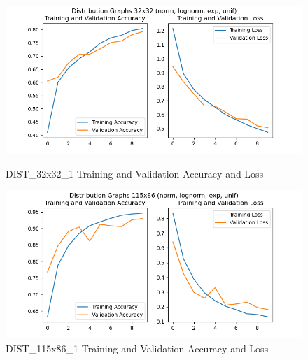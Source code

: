 \documentclass[12pt]{article}
\begin{document}
            \begin{figure}
            
                \begin{center}

                    \includegraphics[scale=0.6]{DIST_32x32_1_HIST_RESULTS.png}
                    \caption{DIST\_32x32\_1 Training and Validation Accuracy and Loss}
                    \label{dist-32-32-val-loss}
        
                \end{center}
                
        
            
                \begin{center}

                    \includegraphics[scale=0.6]{DIST_115x86_1_HIST_RESULTS.png}
                    \caption{DIST\_115x86\_1 Training and Validation Accuracy and Loss}
                    \label{dist-115-86-val-loss}
        
                \end{center}

            
                \begin{center}


\end{center}
\end{figure}
\end{document}
